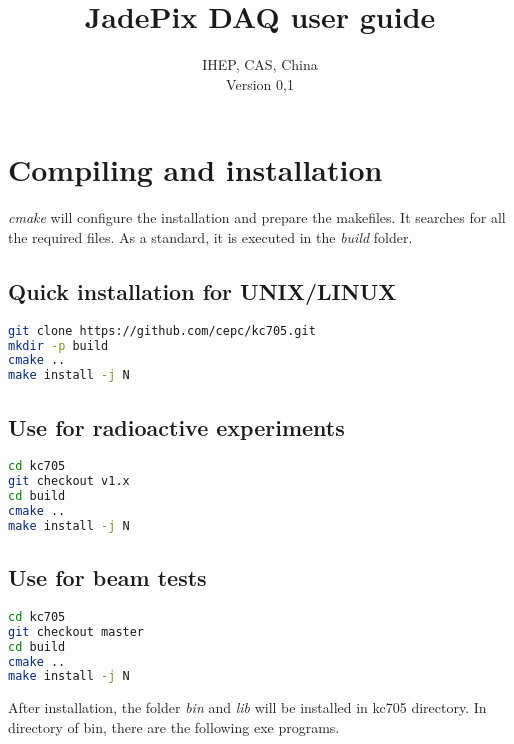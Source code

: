 \documentclass[12pt,a4paper]{article}
\title{JadePix DAQ user guide}
\author{IHEP, CAS, China \\
	\small{Version 0,1}
}
\begin{document}
\maketitle

\newpage

\tableofcontents

\newpage

\section{Compiling and installation}
\label{compiling-and-installation}

\emph{cmake} will configure the installation and prepare the makefiles.
It searches for all the required files. As a standard, it is executed in
the \emph{build} folder.

\subsection{Quick installation for UNIX/LINUX}

\begin{lstlisting}[language=Bash]
git clone https://github.com/cepc/kc705.git
mkdir -p build
cmake ..
make install -j N
\end{lstlisting}

\subsection{Use for radioactive experiments}
\label{use-for-radioactive-experiments}

\begin{lstlisting}[language=Bash]
cd kc705 
git checkout v1.x
cd build
cmake ..
make install -j N
\end{lstlisting}

\subsection{Use for beam tests}
\label{use-for-beam-tests}

\begin{lstlisting}[language=Bash]
cd kc705 
git checkout master
cd build
cmake ..
make install -j N
\end{lstlisting}

After installation, the folder \emph{bin} and \emph{lib} will be installed in
kc705 directory. In directory of bin, there are the following exe programs.
\end{document}
